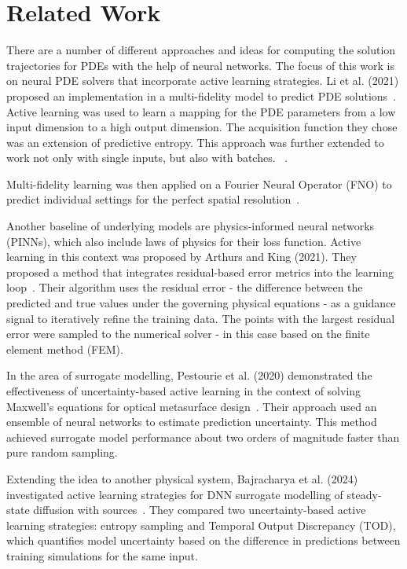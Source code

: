 \chapter{Related Work}

There are a number of different approaches and ideas for computing the solution trajectories for PDEs with the help of neural networks. The focus of this work is on neural PDE solvers that incorporate active learning strategies. Li et al. (2021) proposed an implementation in a multi-fidelity model to predict PDE solutions~\cite{Li2021a}. 
Active learning was used to learn a mapping for the PDE parameters from a low input dimension to a high output dimension. The acquisition function they chose was an extension of predictive entropy. This approach was further extended to work not only with single inputs, but also with batches. ~\cite{Li2022}. 

Multi-fidelity learning was then applied on a Fourier Neural Operator (FNO) to predict individual settings for the perfect spatial resolution~\cite{Li2024}. 

Another baseline of underlying models are physics-informed neural networks (PINNs), which also include laws of physics for their loss function. Active learning in this context was proposed by Arthurs and King (2021). They proposed a method that integrates residual-based error metrics into the learning loop~\cite{ARTHURS2021110364}. Their algorithm uses the residual error - the difference between the predicted and true values under the governing physical equations - as a guidance signal to iteratively refine the training data. The points with the largest residual error were sampled to the numerical solver - in this case based on the finite element method (FEM).

In the area of surrogate modelling, Pestourie et al. (2020) demonstrated the effectiveness of uncertainty-based active learning in the context of solving Maxwell's equations for optical metasurface design~\cite{Pestourie2020}. Their approach used an ensemble of neural networks to estimate prediction uncertainty. This method achieved surrogate model performance about two orders of magnitude faster than pure random sampling.

Extending the idea to another physical system, Bajracharya et al. (2024) investigated active learning strategies for DNN surrogate modelling of steady-state diffusion with sources~\cite{bajracharya2024}. They compared two uncertainty-based active learning strategies: entropy sampling and Temporal Output Discrepancy (TOD), which quantifies model uncertainty based on the difference in predictions between training simulations for the same input. 


